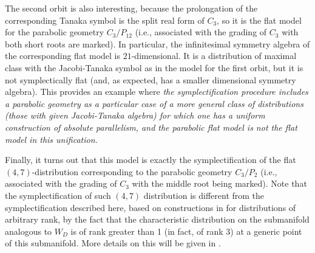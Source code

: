 \documentclass[11pt,letterpaper]{amsart}
\numberwithin{equation}{section}
\begin{document}
The second orbit is also interesting, because the prolongation of the corresponding Tanaka symbol is the split real form of $C_3$, so it is the flat model for the parabolic geometry $C_3/P_{12}$ (i.e., associated with the grading of $C_3$ with both short roots are marked). In particular, the infinitesimal symmetry algebra of the corresponding flat model is $21$-dimensional. It is a distribution of maximal class with the Jacobi-Tanaka symbol as in the model for the first orbit, but it is not symplectically flat (and, as expected, has a smaller dimensional symmetry algebra). This provides an example where \emph{the symplectification procedure includes a parabolic geometry as a particular case of a more general class of distributions (those with given Jacobi-Tanaka algebra) for which one has a uniform construction of absolute parallelism, and the parabolic flat model is 
not the flat model in this unification.}

Finally, it turns out that this model is exactly the symplectification of the flat $(4,7)$-distribution corresponding to the parabolic geometry $C_3/P_2$ (i.e., associated with the grading of $C_3$ with the middle root being marked). Note that the symplectification of such $(4,7)$ distribution is different from the symplectification described here, based on constructions in \cite{doubrov2016JacobiCurves} for distributions of arbitrary rank, by the fact that the characteristic distribution on the submanifold analogous to $W_D$ is of rank greater than 1  (in fact, of rank 3) at a generic point of this submanifold. More details on this will be given in \cite{KZ}.





\end{document}
